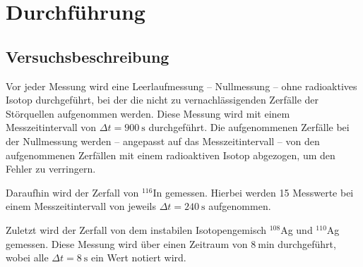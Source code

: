 \section{Durchführung}
\label{sec:Durchführung}



\subsection{Versuchsbeschreibung}
\label{sec:Versuchsbeschreibung}
Vor jeder Messung wird eine Leerlaufmessung -- Nullmessung -- ohne radioaktives Isotop
durchgeführt, bei der die
nicht zu vernachlässigenden Zerfälle der Störquellen aufgenommen werden. Diese Messung wird mit
einem Messzeitintervall von $\Delta t = \SI{900}{\second}$ durchgeführt. Die aufgenommenen
Zerfälle bei der Nullmessung werden -- angepasst auf das Messzeitintervall -- von den
aufgenommenen Zerfällen mit einem radioaktiven Isotop abgezogen, um den Fehler zu verringern.

Daraufhin wird der Zerfall von $^{116}$In gemessen. Hierbei werden 15 Messwerte bei einem
Messzeitintervall von jeweils $\Delta t = \SI{240}{\second}$ aufgenommen.

Zuletzt wird der Zerfall von dem instabilen Isotopengemisch $^{108}$Ag und $^{110}$Ag gemessen.
Diese Messung wird über einen Zeitraum von $\SI{8}{\minute}$ durchgeführt, wobei alle
$\Delta t = \SI{8}{\second}$ ein Wert notiert wird.
